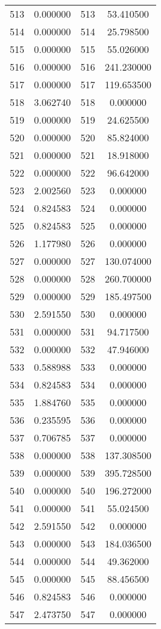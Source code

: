 \documentclass[12pt]{article}
\begin{document}
\begin{longtable}{@{}cccc@{}}
513 & 0.000000 & 513 & 53.410500 \\
514 & 0.000000 & 514 & 25.798500 \\
515 & 0.000000 & 515 & 55.026000 \\
516 & 0.000000 & 516 & 241.230000 \\
517 & 0.000000 & 517 & 119.653500 \\
518 & 3.062740 & 518 & 0.000000 \\
519 & 0.000000 & 519 & 24.625500 \\
520 & 0.000000 & 520 & 85.824000 \\
521 & 0.000000 & 521 & 18.918000 \\
522 & 0.000000 & 522 & 96.642000 \\
523 & 2.002560 & 523 & 0.000000 \\
524 & 0.824583 & 524 & 0.000000 \\
525 & 0.824583 & 525 & 0.000000 \\
526 & 1.177980 & 526 & 0.000000 \\
527 & 0.000000 & 527 & 130.074000 \\
528 & 0.000000 & 528 & 260.700000 \\
529 & 0.000000 & 529 & 185.497500 \\
530 & 2.591550 & 530 & 0.000000 \\
531 & 0.000000 & 531 & 94.717500 \\
532 & 0.000000 & 532 & 47.946000 \\
533 & 0.588988 & 533 & 0.000000 \\
534 & 0.824583 & 534 & 0.000000 \\
535 & 1.884760 & 535 & 0.000000 \\
536 & 0.235595 & 536 & 0.000000 \\
537 & 0.706785 & 537 & 0.000000 \\
538 & 0.000000 & 538 & 137.308500 \\
539 & 0.000000 & 539 & 395.728500 \\
540 & 0.000000 & 540 & 196.272000 \\
541 & 0.000000 & 541 & 55.024500 \\
542 & 2.591550 & 542 & 0.000000 \\
543 & 0.000000 & 543 & 184.036500 \\
544 & 0.000000 & 544 & 49.362000 \\
545 & 0.000000 & 545 & 88.456500 \\
546 & 0.824583 & 546 & 0.000000 \\
547 & 2.473750 & 547 & 0.000000 \\

\end{longtable}
\end{document}
